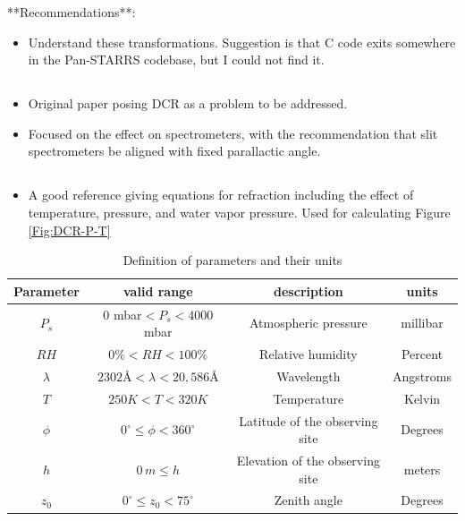 \documentclass[]{article}
\begin{document}
**Recommendations**:
\begin{itemize}
	\item Understand these transformations. Suggestion is that C code exits somewhere in the Pan-STARRS codebase, but I could not find it.
\end{itemize}

\subsection{\cite{Cuby1998}}

\subsection{\cite{Filippenko1982}}
\begin{itemize}
	\item Original paper posing DCR as a problem to be addressed.
	\item Focused on the effect on spectrometers, with the recommendation that slit spectrometers be aligned with fixed parallactic angle.
\end{itemize}


\subsection{\cite{AlejandroPlazas2012}}

\subsection{\cite{Stone1996}}
\begin{itemize}
	\item A good reference giving equations for refraction including the effect of temperature, pressure, and water vapor pressure. Used for calculating Figure \ref{Fig:DCR-P-T} 	
	
\end{itemize}

\begin{table}[h!]
	\begin{center}
	\begin{tabular}{c | c | c | c}
		Parameter & valid range & description & units \\
		\hline
		$P_s$& $0$ mbar$ < P_s < 4000$ mbar & Atmospheric pressure & millibar  \\
		$RH$ & $0\% < RH < 100\%$ & Relative humidity & Percent \\
		$\lambda$& $2302$\AA{}$ < \lambda < 20,586 $\AA{} & Wavelength  & Angstroms \\
		$T$& $250K < T < 320K$ & Temperature & Kelvin \\
		$\phi$ & $0^\circ \leq \phi < 360^\circ$ & Latitude of the observing site & Degrees \\
		$h$ & $0\,m\leq h$ & Elevation of the observing site & meters \\
		$z_0$ & $0^\circ\leq z_0 < 75^\circ$ & Zenith angle & Degrees
	\end{tabular}
	\end{center}
	\caption{Definition of parameters and their units}
\end{table}
\end{document}
